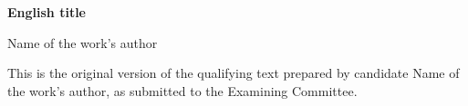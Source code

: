 \documentclass[11pt,oneside,a4paper]{book}
\newcommand{\autor}{Name of the work's author}
\newcommand{\tituloen}{English title}
\begin{document}
\newpage










\thispagestyle{empty}
    \begin{center}
 \begin{minipage}[t][56mm][s]{96mm}
          \vspace*{2cm plus 1.5cm minus 1.8cm}
          \centering
          {\Large \bfseries \tituloen}\\[0.4cm]
           \vspace{1cm plus 1cm minus 0.6cm}

           {\Large\autor}

          \vspace*{2cm plus 1.5cm minus 1.8cm}
      \end{minipage}
     \end{center}
\vskip 2cm
   \begin{flushright}
      \begin{minipage}[t][50mm][s]{80mm}
        \begin{flushright}
          \normalsize{
          This is the original version of the qualifying text
          prepared by candidate \autor,
          as submitted to the Examining Committee. 
          }
        \end{flushright}
        \vspace*{0pt plus 50mm}
      \end{minipage}
      \par
  \end{flushright}
\end{document}
